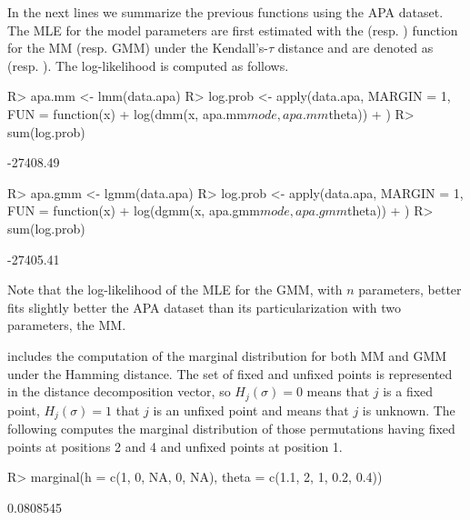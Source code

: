 \documentclass[article,nojss]{jss}
\begin{document}
In the next lines we summarize the previous functions using the APA dataset. The MLE for the model parameters are first estimated with the  (resp. ) function for the MM (resp. GMM) under the Kendall's-$\tau$ distance and are denoted as  (resp. ). The log-likelihood is computed as follows. 
\begin{Schunk}
\begin{Sinput}
R> apa.mm <- lmm(data.apa)
R> log.prob <- apply(data.apa, MARGIN = 1, FUN = function(x) {
+     log(dmm(x, apa.mm$mode, apa.mm$theta))
+ })
R> sum(log.prob)
\end{Sinput}
\begin{Soutput}
[1] -27408.49
\end{Soutput}
\begin{Sinput}
R> apa.gmm <- lgmm(data.apa)
R> log.prob <- apply(data.apa, MARGIN = 1, FUN = function(x) {
+     log(dgmm(x, apa.gmm$mode, apa.gmm$theta))
+ })
R> sum(log.prob)
\end{Sinput}
\begin{Soutput}
[1] -27405.41
\end{Soutput}
\end{Schunk}
Note that the log-likelihood of the MLE for the GMM, with $n$ parameters, better fits slightly better the APA dataset than its particularization with two parameters, the MM. 

 includes the computation of the marginal distribution for both MM and GMM under the Hamming distance. The set of fixed and unfixed points is represented in the distance decomposition vector, so $H_j(\sigma)=0$ means that $j$ is a fixed point,  $H_j(\sigma)=1$ that $j$ is an unfixed point and  means that $j$ is unknown. The following computes the marginal distribution of those permutations having fixed points at positions 2 and 4 and unfixed points at position 1. 

\begin{Schunk}
\begin{Sinput}
R> marginal(h = c(1, 0, NA, 0, NA), theta = c(1.1, 2, 1, 0.2, 0.4))
\end{Sinput}
\begin{Soutput}
[1] 0.0808545
\end{Soutput}
\end{Schunk}
\end{document}
